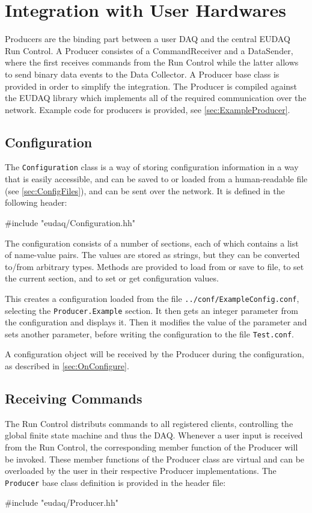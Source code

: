 \section{Integration with User Hardwares}\label{sec:Integration}
Producers are the binding part between a user DAQ and the central EUDAQ Run Control.
A Producer consistes of a CommandReceiver and a DataSender, where the first receives commands from the Run Control while the latter allows to send binary data events to the Data Collector.
A Producer base class is provided in order to simplify the integration.
The Producer is compiled against the EUDAQ library which implements all of the required communication over the network.
Example code for producers is provided, see \autoref{sec:ExampleProducer}.

\subsection{Configuration}
The \texttt{Configuration} class is a way of storing configuration information
in a way that is easily accessible, and can be saved to or loaded from a human-readable file
(see \autoref{sec:ConfigFiles}), and can be sent over the network.
It is defined in the following header:

\begin{listing}
#include "eudaq/Configuration.hh"
\end{listing}

The configuration consists of a number of sections,
each of which contains a list of name-value pairs.
The values are stored as strings, but they can be converted to/from arbitrary types.
Methods are provided to load from or save to file, to set the current section,
and to set or get configuration values.

This creates a configuration loaded from the file \texttt{../conf/ExampleConfig.conf},
selecting the \texttt{Producer.Example} section.
It then gets an integer parameter from the configuration and displays it.
Then it modifies the value of the parameter and sets another parameter,
before writing the configuration to the file \texttt{Test.conf}.

A configuration object will be received by the Producer during the configuration,
as described in \autoref{sec:OnConfigure}.

\subsection{Receiving Commands}
The Run Control distributs commands to all registered clients, controlling the global finite state machine and thus the DAQ.
Whenever a user input is received from the Run Control, the corresponding member function of the Producer will be invoked.
These member functions of the Producer class are virtual and can be overloaded by the user in their respective Producer implementations.
The \texttt{Producer} base class definition is provided in the header file:
\begin{listing}
#include "eudaq/Producer.hh"
\end{listing}

